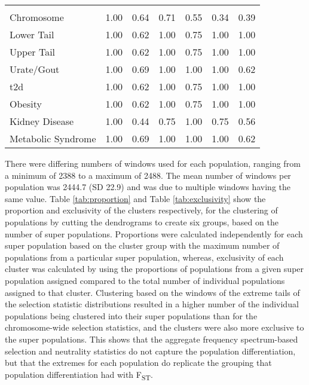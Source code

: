 \documentclass[]{report}
\begin{document}
\begin{table}
\begin{tabular}[t]{lllllll}
\addlinespace[0.3em]
\multicolumn{7}{l}{\textbf{Zeng's E}}\\
\hspace{1em}Chromosome & 1.00 & 0.64 & 0.71 & 0.55 & 0.34 & 0.39\\
\hspace{1em}Lower Tail & 1.00 & 0.62 & 1.00 & 0.75 & 1.00 & 1.00\\
\hspace{1em}Upper Tail & 1.00 & 0.62 & 1.00 & 0.75 & 1.00 & 1.00\\
\hspace{1em}Urate/Gout & 1.00 & 0.69 & 1.00 & 1.00 & 1.00 & 0.62\\
\hspace{1em}\Gls{t2d} & 1.00 & 0.62 & 1.00 & 0.75 & 1.00 & 1.00\\
\hspace{1em}Obesity & 1.00 & 0.62 & 1.00 & 0.75 & 1.00 & 1.00\\
\hspace{1em}Kidney Disease & 1.00 & 0.44 & 0.75 & 1.00 & 0.75 & 0.56\\
\hspace{1em}Metabolic Syndrome & 1.00 & 0.69 & 1.00 & 1.00 & 1.00 & 0.62\\
\bottomrule
\end{tabular}
\end{table}

There were differing numbers of windows used for each population,
ranging from a minimum of 2388 to a maximum of 2488. The mean number of
windows per population was 2444.7 (SD 22.9) and was due to multiple
windows having the same value. Table \ref{tab:proportion} and Table
\ref{tab:exclusivity} show the proportion and exclusivity of the
clusters respectively, for the clustering of populations by cutting the
dendrograms to create six groups, based on the number of super
populations. Proportions were calculated independently for each super
population based on the cluster group with the maximum number of
populations from a particular super population, whereas, exclusivity of
each cluster was calculated by using the proportions of populations from
a given super population assigned compared to the total number of
individual populations assigned to that cluster. Clustering based on the
windows of the extreme tails of the selection statistic distributions
resulted in a higher number of the individual populations being
clustered into their super populations than for the chromosome-wide
selection statistics, and the clusters were also more exclusive to the
super populations. This shows that the aggregate frequency
spectrum-based selection and neutrality statistics do not capture the
population differentiation, but that the extremes for each population do
replicate the grouping that population differentiation had with
F\textsubscript{ST}.
\end{document}
